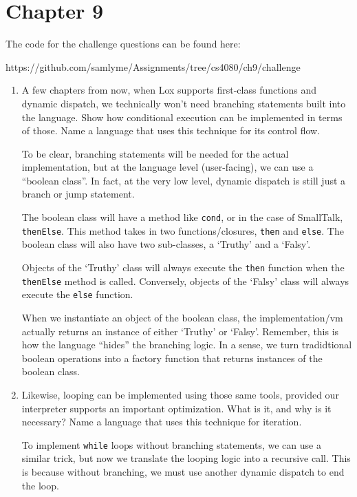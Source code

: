 \documentclass{article}
\begin{document}
\section*{Chapter 9}

The code for the challenge questions can be found here: 

https://github.com/samlyme/Assignments/tree/cs4080/ch9/challenge

\begin{enumerate}
    \item {
        A few chapters from now, when Lox supports first-class functions and dynamic dispatch, we technically won’t need branching statements built into the language. Show how conditional execution can be implemented in terms of those. Name a language that uses this technique for its control flow.

        To be clear, branching statements will be needed for the actual implementation,
        but at the language level (user-facing), we can use a ``boolean class''. 
        In fact, at the very low level, dynamic dispatch is still just a branch 
        or jump statement.

        The boolean class will have a method like \verb|cond|, or in the case of 
        SmallTalk, \verb|thenElse|. This method takes in two functions/closures, 
        \verb|then| and \verb|else|.
        The boolean class will also have two sub-classes, a `Truthy' and a `Falsy'.

        Objects of the `Truthy' class will always execute the \verb|then| function when 
        the \verb|thenElse| method is called. Conversely, objects of the `Falsy'
        class will always execute the \verb|else| function.

        When we instantiate an object of the boolean class, the implementation/vm
        actually returns an instance of either `Truthy' or `Falsy'. Remember, 
        this is how the language ``hides'' the branching logic. In a sense, 
        we turn tradidtional boolean operations into a factory function that 
        returns instances of the boolean class.
    }

    \item {
        Likewise, looping can be implemented using those same tools, provided our interpreter supports an important optimization. What is it, and why is it necessary? Name a language that uses this technique for iteration.

        To implement \verb|while| loops without branching statements, we can 
        use a similar trick, but now we translate the looping logic into a recursive 
        call. This is because without branching, we must use another dynamic 
        dispatch to end the loop. 

}
\end{enumerate}
\end{document}
